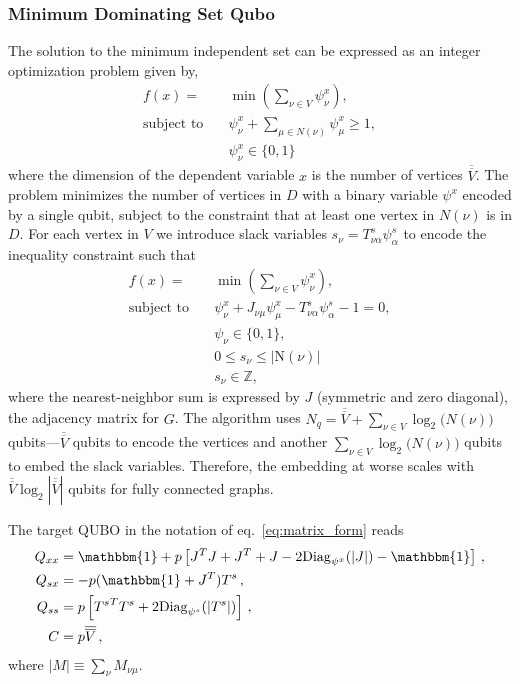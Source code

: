 \documentclass[prd,twocolumn,tightenlines,preprintnumbers,showpacs,superscriptaddress,notitlepage,nofootinbib,eqsecnum,floatfix,longbibliography]{revtex4}
\begin{document}
\subsubsection{Minimum Dominating Set Qubo}
\label{sec:methods:mds-qubo}

The solution to the minimum independent set can be expressed as an integer optimization problem given by,
\begin{align}
    f(x) = &\min\left(\sum_{\nu \in V} \psi^x_{\nu}\right),\\
    \textrm{subject to} \quad & \psi^x_{\nu} + \sum_{\mu \in \mathit{N}(\nu)} \psi^x_{\mu} \geq 1,\\
    & \psi^x_{\nu} \in \{0, 1\}
\end{align}
where the dimension of the dependent variable $x$ is the number of vertices $\overline{\overline{V}}$.
The problem minimizes the number of vertices in $D$ with a binary variable $\psi^x$ encoded by a single qubit, subject to the constraint that at least one vertex in $\mathit{N}(\nu)$ is in $D$.
For each vertex in $V$ we introduce slack variables $s_{\nu} = T^s_{\nu \alpha} \psi^s_{\alpha}$ to encode the inequality constraint such that
\begin{align}
    f(x) = &\min(\sum_{\nu\in V} \psi^x_{\nu}),\\
    \textrm{subject to} \quad & \psi^x_{\nu} + J_{\nu \mu} \psi^x_{\mu}- T^s_{\nu \alpha} \psi^s_{\alpha}  - 1 = 0,\\
    & \psi_{\nu} \in \{0, 1\},\\
    & 0 \leq s_{\nu} \leq |\mathrm{N}(\nu)|\\
    & s_{\nu} \in \mathbb{Z},
\end{align}
where the nearest-neighbor sum is expressed by $J$ (symmetric and zero diagonal), the adjacency matrix for $G$.
The algorithm uses $N_q = \overline{\overline{V}} + \sum_{\nu \in V} \log_2 \mathit(N(\nu))$ qubits---$\overline{\overline{V}}$ qubits to encode the vertices and another $\sum_{\nu \in V} \log_2 \mathit(N(\nu))$ qubits to embed the slack variables.
Therefore, the embedding at worse scales with $\overline{\overline{V}} \log_2 |\overline{\overline{V}}|$ qubits for fully connected graphs.

The target QUBO in the notation of eq.~\eqref{eq:matrix_form} reads
{\small
\begin{align}
    Q_{xx} &= \mathbbm{1} + p\left[J^T J + J^T + J - 2 \mathrm{Diag}_{\psi^x}(|J|) - \mathbbm{1} \right] \,,\\
    Q_{sx} &= - p(\mathbbm{1}+J^T)T^s\,,\\
    Q_{ss} &= p\left[{T^s}^T T^s + 2\mathrm{Diag}_{\psi^s}(|T^s|)\right]\,,\\
    C &=  p \overline{\overline{V}}\,,
\end{align}}
where $ |M| \equiv \sum_{\nu} M_{\nu \mu}$.
\end{document}
